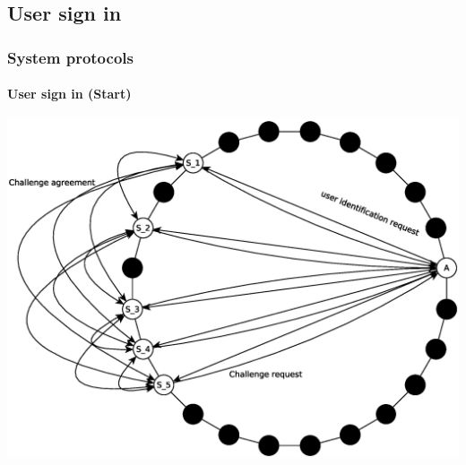 \subsection{User sign in}
\begin{frame}
\frametitle{System protocols}
\framesubtitle{User sign in (Start)}
\includegraphics[height=0.7\textheight]{../../img/sign_in}\\
\end{frame}

